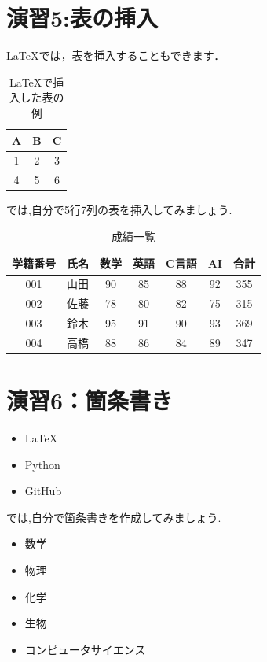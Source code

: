 \documentclass[a4paper,twocolumn]{jsarticle}
\begin{document}
\section*{演習5:表の挿入}
LaTeXでは，表を挿入することもできます．
\begin{table}[H]
    \centering
    \begin{tabular}{|c|c|c|}
        \hline
        A & B & C \\
        \hline
        1 & 2 & 3 \\
        4 & 5 & 6 \\
        \hline
    \end{tabular}
    \caption{LaTeXで挿入した表の例}
    \label{tab:practice}
\end{table}
では,自分で5行7列の表を挿入してみましょう.\\
\begin{table}[H]
\centering
\caption{成績一覧}
\label{tab:sample}
\begin{tabular}{|c|c|c|c|c|c|c|}
\hline
学籍番号 & 氏名 & 数学 & 英語 & C言語 & AI & 合計 \\
\hline
001 & 山田 & 90 & 85 & 88 & 92 & 355 \\
\hline
002 & 佐藤 & 78 & 80 & 82 & 75 & 315 \\
\hline
003 & 鈴木 & 95 & 91 & 90 & 93 & 369 \\
\hline
004 & 高橋 & 88 & 86 & 84 & 89 & 347 \\
\hline
\end{tabular}
\end{table}
\section*{演習6：箇条書き}
\begin{itemize}
    \item LaTeX
    \item Python
    \item GitHub
\end{itemize}
では,自分で箇条書きを作成してみましょう.\\
\begin{itemize}
    \item 数学
    \item 物理
    \item 化学
    \item 生物
    \item コンピュータサイエンス
\end{itemize}
\end{document}
